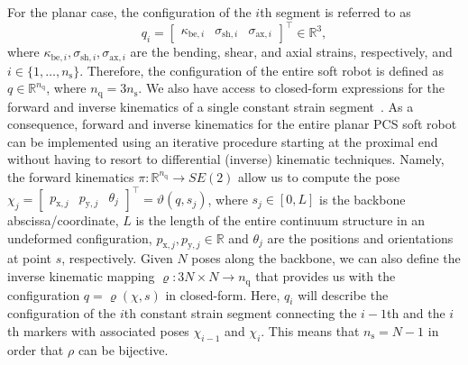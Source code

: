 For the planar case, the configuration of the $i$th segment is referred to as
\begin{equation}
    q_i= \begin{bmatrix}
    \kappa_{\mathrm{be},i} & \sigma_{\mathrm{sh},i} & \sigma_{\mathrm{ax},i}
\end{bmatrix}^\top \in \mathbb{R}^3,
\end{equation}
where $\kappa_{\mathrm{be},i}, \sigma_{\mathrm{sh},i}, \sigma_{\mathrm{ax},i}$ are the bending, shear, and axial strains, respectively, and $i \in \{1, \dots, n_\mathrm{s} \}$. 
Therefore, the configuration of the entire soft robot is defined as $q \in \mathbb{R}^{n_\mathrm{q}}$, where $n_\mathrm{q} = 3 n_\mathrm{s}$.
We also have access to closed-form expressions for the forward and inverse kinematics of a single constant strain segment~\citep{stolzle2024experimental}.
As a consequence, forward and inverse kinematics for the entire planar \gls{PCS} soft robot can be implemented using an iterative procedure starting at the proximal end without having to resort to differential (inverse) kinematic techniques.
Namely, the forward kinematics $\pi: \mathbb{R}^{n_\mathrm{q}} \to SE(2)$ allow us to compute the pose $\chi_j = \begin{bmatrix}
    p_{\mathrm{x},j} & p_{\mathrm{y},j} & \theta_j
\end{bmatrix}^\top = \vartheta(q,s_j)$, where $s_j \in [0, L]$ is the backbone abscissa/coordinate, $L$ is the length of the entire continuum structure in an undeformed configuration, $p_{\mathrm{x},j}, p_{\mathrm{y},j} \in \mathbb{R}$ and $\theta_j$ are the positions and orientations at point $s$, respectively.
Given $N$ poses along the backbone, we can also define the inverse kinematic mapping $\varrho: 3N \times N \to n_\mathrm{q}$ that provides us with the configuration $q = \varrho(\chi, s)$ in closed-form. Here, $q_i$ will describe the configuration of the $i$th constant strain segment connecting the $i-1$th and the $i$th markers with associated poses $\chi_{i-1}$ and $\chi_i$. This means that $n_\mathrm{s} = N -1$ in order that $\rho$ can be bijective.



